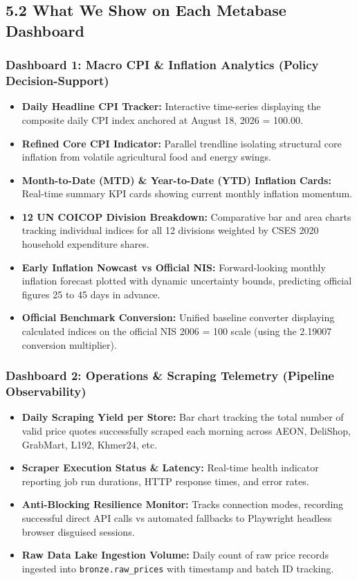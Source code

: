 \documentclass[10pt,a4paper]{article}
\begin{document}
\subsection*{5.2 What We Show on Each Metabase Dashboard}

\subsubsection*{Dashboard 1: Macro CPI \& Inflation Analytics (Policy Decision-Support)}
\begin{itemize}[noitemsep,topsep=1pt,leftmargin=*]
    \item \textbf{Daily Headline CPI Tracker:} Interactive time-series displaying the composite daily CPI index anchored at August 18, 2026 = 100.00.
    \item \textbf{Refined Core CPI Indicator:} Parallel trendline isolating structural core inflation from volatile agricultural food and energy swings.
    \item \textbf{Month-to-Date (MTD) \& Year-to-Date (YTD) Inflation Cards:} Real-time summary KPI cards showing current monthly inflation momentum.
    \item \textbf{12 UN COICOP Division Breakdown:} Comparative bar and area charts tracking individual indices for all 12 divisions weighted by CSES 2020 household expenditure shares.
    \item \textbf{Early Inflation Nowcast vs Official NIS:} Forward-looking monthly inflation forecast plotted with dynamic uncertainty bounds, predicting official figures 25 to 45 days in advance.
    \item \textbf{Official Benchmark Conversion:} Unified baseline converter displaying calculated indices on the official NIS 2006 = 100 scale (using the 2.19007 conversion multiplier).
\end{itemize}

\subsubsection*{Dashboard 2: Operations \& Scraping Telemetry (Pipeline Observability)}
\begin{itemize}[noitemsep,topsep=1pt,leftmargin=*]
    \item \textbf{Daily Scraping Yield per Store:} Bar chart tracking the total number of valid price quotes successfully scraped each morning across AEON, DeliShop, GrabMart, L192, Khmer24, etc.
    \item \textbf{Scraper Execution Status \& Latency:} Real-time health indicator reporting job run durations, HTTP response times, and error rates.
    \item \textbf{Anti-Blocking Resilience Monitor:} Tracks connection modes, recording successful direct API calls vs automated fallbacks to Playwright headless browser disguised sessions.
    \item \textbf{Raw Data Lake Ingestion Volume:} Daily count of raw price records ingested into \texttt{bronze.raw\_prices} with timestamp and batch ID tracking.
\end{itemize}
\end{document}
